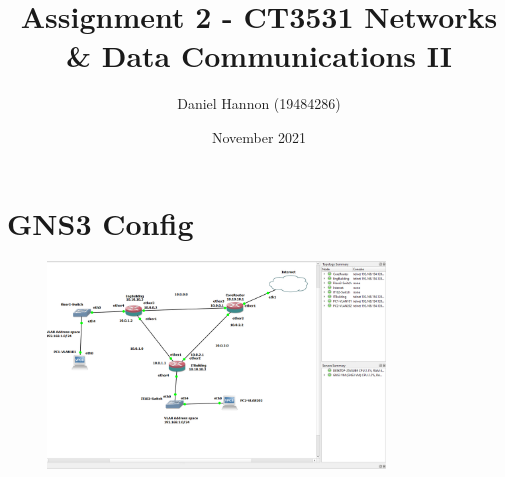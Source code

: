 \documentclass{article}
\title{Assignment 2 -  CT3531 Networks \& Data Communications II}
\author{Daniel Hannon (19484286)}
\date{November 2021}
\begin{document}
	\maketitle
	\section{GNS3 Config}
		\begin{figure}[h!]
			\centering
			\includegraphics[width=0.8\textwidth]{gns3_config}
		\end{figure}
		\newpage
\end{document}
